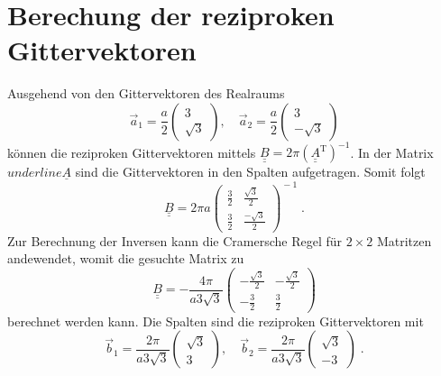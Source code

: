 \chapter{Berechung der reziproken Gittervektoren}
\label{chap:appendixA}
Ausgehend von den Gittervektoren des Realraums 
\begin{equation*}
    \vec{a}_1 = \frac{a}{2}\begin{pmatrix} 3 \\[4pt] \sqrt{3}  \end{pmatrix}, \quad
    \vec{a}_2 = \frac{a}{2}\begin{pmatrix} 3 \\[4pt] -\sqrt{3} \end{pmatrix}       
\end{equation*}   
können die reziproken Gittervektoren mittels $\underline{\underline{B}} = 2\pi \left ( \underline{\underline{A}}^\text{T} \right )^{-1} $.\cite{suter}
In der Matrix $underline{\underline{A}}$ sind die Gittervektoren in den Spalten aufgetragen.
Somit folgt 
\begin{equation*}
    \underline{\underline{B}} = 2 \pi a
    \begin{pmatrix}
        \frac{3}{2} & \frac{\sqrt{3}}{2}  \\[0.35em]
        \frac{3}{2} & \frac{-\sqrt{3}}{2}
    \end{pmatrix}^{\! -1} \; .
\end{equation*}
Zur Berechnung der Inversen kann die Cramersche Regel für $2\times 2$ Matritzen andewendet, womit die gesuchte Matrix zu
\begin{equation*}
    \underline{\underline{B}} = - \frac{4\pi}{a3\sqrt{3}}
    \begin{pmatrix}
        -\frac{\sqrt{3}}{2} & -\frac{\sqrt{3}}{2}  \\[0.35em]
        -\frac{3}{2} & \frac{3}{2}
    \end{pmatrix}
\end{equation*}
berechnet werden kann.\cite{Cramer}
Die Spalten sind die reziproken Gittervektoren mit 
\begin{equation*}
    \vec{b}_1 = \frac{2\pi}{a3\sqrt{3}}\begin{pmatrix} \sqrt{3} \\[4pt] 3  \end{pmatrix}, \quad
    \vec{b}_2 = \frac{2\pi}{a3\sqrt{3}}\begin{pmatrix} \sqrt{3}       \\[4pt] -3 \end{pmatrix}   \; .  
\end{equation*}   
